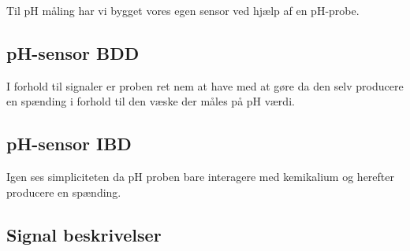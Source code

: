 
Til pH måling har vi bygget vores egen sensor ved hjælp af en pH-probe.

\subsection{pH-sensor BDD}
I forhold til signaler er proben ret nem at have med at gøre da den selv producere en spænding i forhold til den væske der måles på pH værdi.


\subsection{pH-sensor IBD}
Igen ses simpliciteten da pH proben bare interagere med kemikalium og herefter producere en spænding.


\subsection{Signal beskrivelser}
